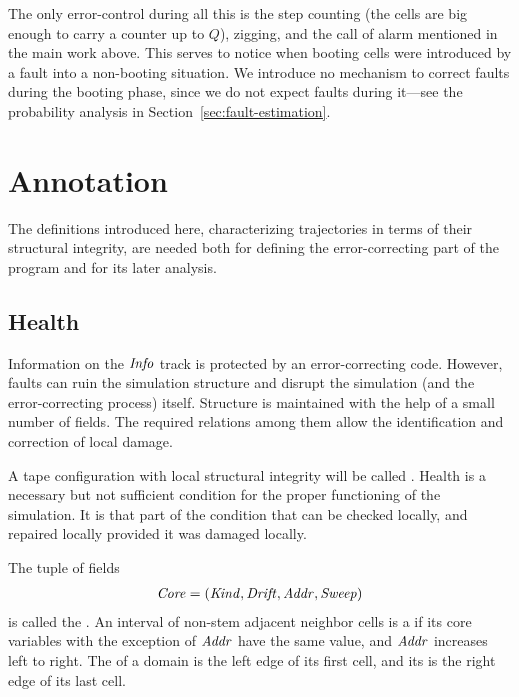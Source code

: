 \documentclass[11pt]{memoir}
\theoremstyle{definition} %
\newcommand{\fld}[1]{\ensuremath{\textit{#1\/}}}
\newcommand{\Q}{Q} %
\newcommand{\Addr}{\fld{Addr}}
\newcommand{\Core}{\fld{Core}}
\newcommand{\Drift}{\fld{Drift}}
\newcommand{\Info}{\fld{Info}}
\newcommand{\Kind}{\fld{Kind}}
\newcommand{\Sweep}{\fld{Sweep}} %
\begin{document}
The only error-control during all this is the step counting (the cells are big enough
to carry a counter up to \( \Q \)), zigging, and the call of alarm mentioned in the main work above.
This serves to notice when booting cells were introduced by a fault
into a non-booting situation.
We introduce no mechanism to correct faults during the booting phase, since
we do not expect faults
during it---see the probability analysis in Section~\ref{sec:fault-estimation}.


\section{Annotation}    \label{sec:annotation}

The definitions introduced here, characterizing trajectories in terms of their structural integrity,
are needed both for defining the error-correcting part of the
program and for its later analysis.

\subsection{Health}            \label{sec:health}

Information on the \( \Info \) track is protected by an error-correcting code.
However, faults can ruin the simulation structure and disrupt the simulation
(and the error-correcting process) itself.
Structure is maintained with the help of a small number of fields.
The required relations among them 
allow the identification and correction of local damage.

A tape configuration with local structural integrity will be called .
Health is a necessary but not sufficient condition for the proper functioning of the simulation.
It is that part of the condition that can be checked locally, and repaired locally provided it
was damaged locally.

\begin{definition}\label{def:domains}
The tuple of fields
\begin{align*}
   \Core =(\Kind,\Drift,\Addr,\Sweep)
 \end{align*}
is called the .   
 An interval of non-stem adjacent neighbor cells is a  if
 its core variables with the exception of \( \Addr \) have the same value, and
 \( \Addr \) increases left to right.
The  of a domain is the left edge of its first cell, and its  is 
the right edge of its last cell.
\end{definition}
\end{document}
